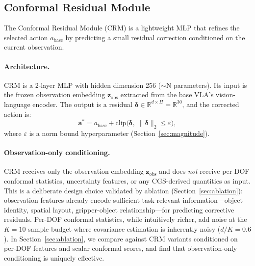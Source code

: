 \subsection{Conformal Residual Module}
\label{sec:crm}

The Conformal Residual Module (CRM) is a lightweight MLP that refines the selected action $a_{\mathrm{base}}$ by predicting a small residual correction conditioned on the current observation.

\paragraph{Architecture.}
CRM is a 2-layer MLP with hidden dimension 256 (${\sim}$N parameters).%
Its input is the frozen observation embedding $\mathbf{z}_{\mathrm{obs}}$ extracted from the base VLA's vision-language encoder. The output is a residual $\boldsymbol{\delta} \in \mathbb{R}^{d \times H} = \mathbb{R}^{30}$, and the corrected action is:
\begin{equation}
  \mathbf{a}^* = a_{\mathrm{base}} + \mathrm{clip}\bigl(\boldsymbol{\delta},\; \|\boldsymbol{\delta}\|_2 \leq \varepsilon\bigr),
  \label{eq:crm}
\end{equation}
where $\varepsilon$ is a norm bound hyperparameter (Section~\ref{sec:magnitude}).

\paragraph{Observation-only conditioning.}
CRM receives only the observation embedding $\mathbf{z}_{\mathrm{obs}}$ and does \emph{not} receive per-DOF conformal statistics, uncertainty features, or any CGS-derived quantities as input. This is a deliberate design choice validated by ablation (Section~\ref{sec:ablation}): observation features already encode sufficient task-relevant information---object identity, spatial layout, gripper-object relationship---for predicting corrective residuals. Per-DOF conformal statistics, while intuitively richer, add noise at the $K{=}10$ sample budget where covariance estimation is inherently noisy ($d/K = 0.6$). In Section~\ref{sec:ablation}, we compare against CRM variants conditioned on per-DOF features and scalar conformal scores, and find that observation-only conditioning is uniquely effective.


